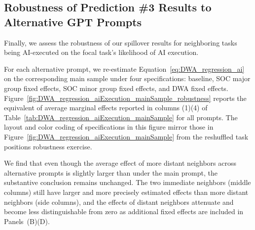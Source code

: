 \subsection{Robustness of Prediction \#3 Results to Alternative GPT Prompts}
\label{app:gptPrompts_robustness_pred3}

Finally, we assess the robustness of our spillover results for neighboring tasks being AI-executed on the focal task's likelihood of AI execution.

For each alternative prompt, we re-estimate Equation~\eqref{eq:DWA_regression_ai} on the corresponding main sample under four specifications: baseline, SOC major group fixed effects, SOC minor group fixed effects, and DWA fixed effects.
Figure~\ref{fig:DWA_regression_aiExecution_mainSample_robustness} reports the equivalent of average marginal effects reported in columns (1)\textendash(4) of Table~\ref{tab:DWA_regression_aiExecution_mainSample} for all prompts.
The layout and color coding of specifications in this figure mirror those in Figure~\ref{fig:DWA_regression_aiExecution_mainSample} from the reshuffled task positions robustness exercise.

We find that even though the average effect of more distant neighbors across alternative prompts is slightly larger than under the main prompt, the substantive conclusion remains unchanged.
The two immediate neighbors (middle columns) still have larger and more precisely estimated effects than more distant neighbors (side columns), and the effects of distant neighbors attenuate and become less distinguishable from zero as additional fixed effects are included in Panels~(B)\textendash (D).

